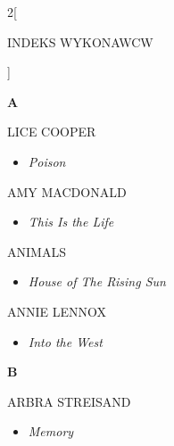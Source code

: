 \documentclass[a4paper]{report}
\begin{document}
\begin{multicols*}{2}[\begin{Huge}INDEKS WYKONAWCW\end{Huge}\vspace{1cm}]\begin{minipage}{\columnwidth}
	\begin{Large}\textbf{A}\end{Large}LICE COOPER 
	\begin{itemize}[topsep=3pt, after=\vspace{3mm}]
		\itemsep0em
		\item[]\textit{Poison}  \\
	\end{itemize}
\end{minipage}
\begin{minipage}{\columnwidth}
	AMY MACDONALD 
	\begin{itemize}[topsep=3pt, after=\vspace{3mm}]
		\itemsep0em
		\item[]\textit{This Is the Life}  \\
	\end{itemize}
\end{minipage}
\begin{minipage}{\columnwidth}
	ANIMALS 
	\begin{itemize}[topsep=3pt, after=\vspace{3mm}]
		\itemsep0em
		\item[]\textit{House of The Rising Sun}  \\
	\end{itemize}
\end{minipage}
\begin{minipage}{\columnwidth}
	ANNIE LENNOX 
	\begin{itemize}[topsep=3pt, after=\vspace{3mm}]
		\itemsep0em
		\item[]\textit{Into the West}  \\
	\end{itemize}
\end{minipage}
\begin{minipage}{\columnwidth}
	\begin{Large}\textbf{B}\end{Large}ARBRA STREISAND 
	\begin{itemize}[topsep=3pt, after=\vspace{3mm}]
		\itemsep0em
		\item[]\textit{Memory}  \\

\end{itemize}
\end{minipage}
\end{multicols*}
\end{document}

